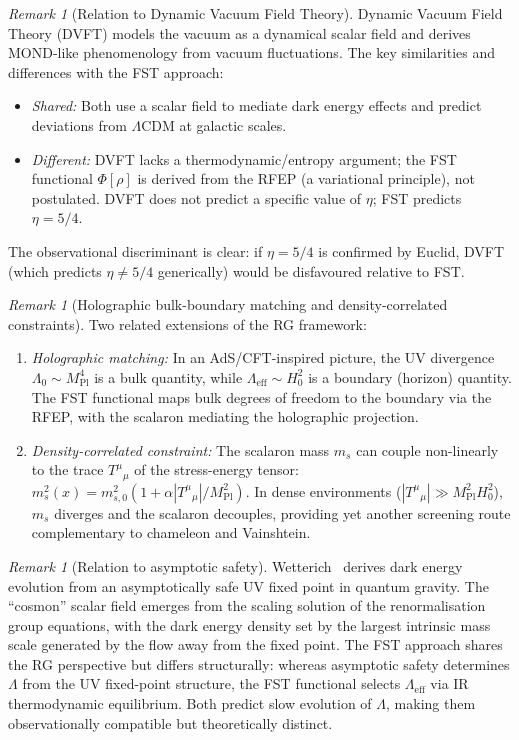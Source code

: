 \documentclass[12pt,a4paper]{article}
\theoremstyle{definition}
\theoremstyle{plain}
\theoremstyle{remark}
\newtheorem{remark}[definition]{Remark}
\begin{document}
\begin{remark}[Relation to Dynamic Vacuum Field Theory]
\label{rem:dvft}
Dynamic Vacuum Field Theory (DVFT) models the vacuum as a dynamical scalar field and derives MOND-like phenomenology from vacuum fluctuations. The key similarities and differences with the FST approach:
\begin{itemize}
\item \emph{Shared:} Both use a scalar field to mediate dark energy effects and predict deviations from $\Lambda$CDM at galactic scales.
\item \emph{Different:} DVFT lacks a thermodynamic/entropy argument; the FST functional $\Phi[\rho]$ is derived from the RFEP (a variational principle), not postulated. DVFT does not predict a specific value of $\eta$; FST predicts $\eta = 5/4$.
\end{itemize}
The observational discriminant is clear: if $\eta = 5/4$ is confirmed by Euclid, DVFT (which predicts $\eta \neq 5/4$ generically) would be disfavoured relative to FST.
\end{remark}

\begin{remark}[Holographic bulk-boundary matching and density-correlated constraints]
\label{rem:holographic-matching}
Two related extensions of the RG framework:
\begin{enumerate}
\item \emph{Holographic matching:} In an AdS/CFT-inspired picture, the UV divergence $\Lambda_0 \sim M_{\mathrm{Pl}}^4$ is a bulk quantity, while $\Lambda_{\mathrm{eff}} \sim H_0^2$ is a boundary (horizon) quantity. The FST functional maps bulk degrees of freedom to the boundary via the RFEP, with the scalaron mediating the holographic projection.
\item \emph{Density-correlated constraint:} The scalaron mass $m_s$ can couple non-linearly to the trace $T^\mu{}_\mu$ of the stress-energy tensor: $m_s^2(x) = m_{s,0}^2 (1 + \alpha |T^\mu{}_\mu| / M_{\mathrm{Pl}}^2)$. In dense environments ($|T^\mu{}_\mu| \gg M_{\mathrm{Pl}}^2 H_0^2$), $m_s$ diverges and the scalaron decouples, providing yet another screening route complementary to chameleon and Vainshtein.
\end{enumerate}
\end{remark}

\begin{remark}[Relation to asymptotic safety]
\label{rem:asymptotic-safety}
Wetterich~\cite{Wetterich2024} derives dark energy evolution from an asymptotically safe UV fixed point in quantum gravity. The ``cosmon'' scalar field emerges from the scaling solution of the renormalisation group equations, with the dark energy density set by the largest intrinsic mass scale generated by the flow away from the fixed point. The FST approach shares the RG perspective but differs structurally: whereas asymptotic safety determines $\Lambda$ from the UV fixed-point structure, the FST functional selects $\Lambda_{\mathrm{eff}}$ via IR thermodynamic equilibrium. Both predict slow evolution of $\Lambda$, making them observationally compatible but theoretically distinct.
\end{remark}
\end{document}
